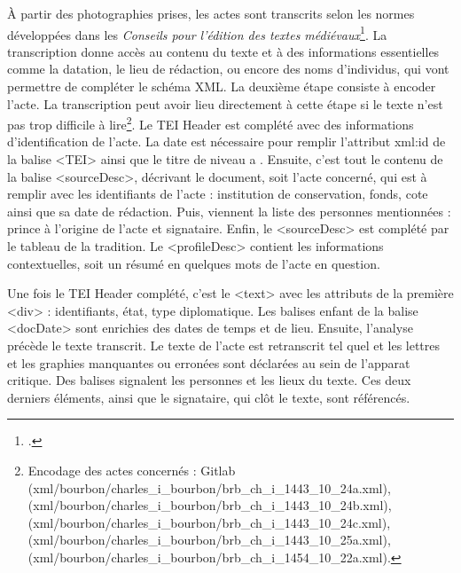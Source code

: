 \par À partir des photographies prises, les actes sont transcrits selon les normes développées dans les \textit{Conseils pour l'édition des textes médiévaux}\footnote{\cite{guyotjeanninConseilsPourEdition2009}.}. La transcription donne accès au contenu du texte et à des informations essentielles comme la datation, le lieu de rédaction, ou encore des noms d'individus, qui vont permettre de compléter le schéma XML. La deuxième étape consiste à encoder l'acte. La transcription peut avoir lieu directement à cette étape si le texte n'est pas trop difficile à lire\footnote{Encodage des actes concernés : Gitlab \newline (xml/bourbon/charles\_i\_bourbon/brb\_ch\_i\_1443\_10\_24a.xml), \newline (xml/bourbon/charles\_i\_bourbon/brb\_ch\_i\_1443\_10\_24b.xml), \newline (xml/bourbon/charles\_i\_bourbon/brb\_ch\_i\_1443\_10\_24c.xml), \newline (xml/bourbon/charles\_i\_bourbon/brb\_ch\_i\_1443\_10\_25a.xml), \newline (xml/bourbon/charles\_i\_bourbon/brb\_ch\_i\_1454\_10\_22a.xml).}. Le TEI Header est complété avec des informations d'identification de l'acte. La date est nécessaire pour remplir l'attribut \og xml:id \fg \space de la balise <TEI> ainsi que le titre de niveau \og a \fg. Ensuite, c'est tout le contenu de la balise <sourceDesc>, décrivant le document, soit l'acte concerné, qui est à remplir avec les identifiants de l'acte : institution de conservation, fonds, cote ainsi que sa date de rédaction. Puis, viennent la liste des personnes mentionnées : prince à l'origine de l'acte et signataire. Enfin, le <sourceDesc> est complété par le tableau de la tradition. Le <profileDesc> contient les informations contextuelles, soit un résumé en quelques mots de l'acte en question. 
\newpage

\par Une fois le TEI Header complété, c'est le <text> avec les attributs de la première <div> : identifiants, état, type diplomatique. Les balises enfant de la balise <docDate> sont enrichies des dates de temps et de lieu. Ensuite, l'analyse précède le texte transcrit. Le texte de l'acte est retranscrit tel quel et les lettres et les graphies manquantes ou erronées sont déclarées au sein de l'apparat critique. Des balises signalent les personnes et les lieux du texte. Ces deux derniers éléments, ainsi que le signataire, qui clôt le texte, sont référencés. 
\newline 


